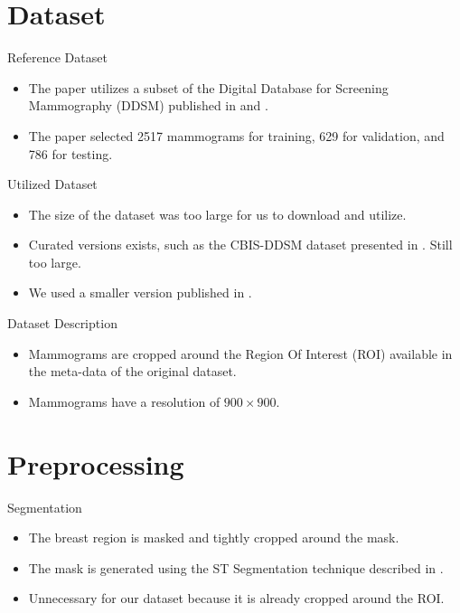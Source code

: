 \documentclass{beamer}
\begin{document}
\section{Dataset}

\begin{frame}{Reference Dataset}
  \begin{itemize}
    \item The paper utilizes a subset of the \alert{Digital Database for
      Screening Mammography (DDSM)} published in \autocite{Bowyer1996}
      and \autocite{Heath1998}.
    \item The paper selected 2517 mammograms for training, 629 for validation,
      and 786 for testing.
  \end{itemize}
\end{frame}

\begin{frame}{Utilized Dataset}
  \begin{itemize}
    \item The size of the dataset was too large for us to download and utilize.
    \item Curated versions exists, such as the \alert{CBIS-DDSM} dataset
      presented in \autocite{Lee2017}. Still too large.
    \item We used a smaller version published in \autocite{Luka2020}.
  \end{itemize}
\end{frame}

\begin{frame}{Dataset Description}
  \begin{itemize}
    \item Mammograms are cropped around the \alert{Region Of Interest (ROI)}
      available in the meta-data of the original dataset.
    \item Mammograms have a resolution of $900 \times 900$.
  \end{itemize}
\end{frame}

\section{Preprocessing}

\begin{frame}{Segmentation}
  \begin{itemize}
    \item The breast region is masked and tightly cropped around the mask.
    \item The mask is generated using the \alert{ST Segmentation} technique
      described in \autocite{Pertuz2014}.
    \item Unnecessary for our dataset because it is already cropped around the
      ROI.
  \end{itemize}
\end{frame}
\end{document}
